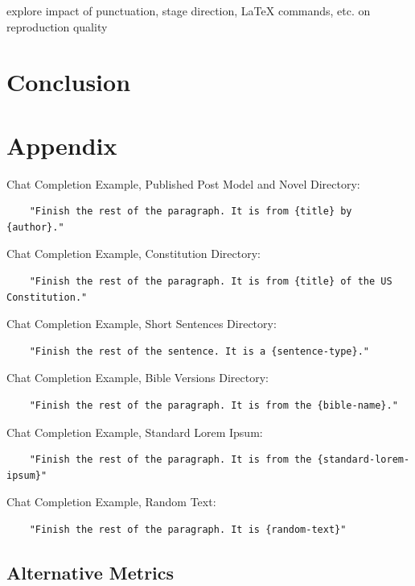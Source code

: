 \documentclass{article}
\begin{document}
explore impact of punctuation, stage direction, LaTeX commands, etc. on reproduction quality

\section{Conclusion}
\label{sec:conclusion}





\section{Appendix}

Chat Completion Example, Published Post Model and Novel Directory:
    \begin{verbatim}
    "Finish the rest of the paragraph. It is from {title} by {author}." 
    \end{verbatim}
    
    
Chat Completion Example, Constitution Directory:
    \begin{verbatim}
    "Finish the rest of the paragraph. It is from {title} of the US Constitution."
    \end{verbatim}
    

Chat Completion Example, Short Sentences Directory:
    \begin{verbatim}
    "Finish the rest of the sentence. It is a {sentence-type}." 
    \end{verbatim}
    
    
Chat Completion Example, Bible Versions Directory:
    \begin{verbatim}
    "Finish the rest of the paragraph. It is from the {bible-name}."
    \end{verbatim}


Chat Completion Example, Standard Lorem Ipsum:
    \begin{verbatim}
    "Finish the rest of the paragraph. It is from the {standard-lorem-ipsum}"
    \end{verbatim}


Chat Completion Example, Random Text:
    \begin{verbatim}
    "Finish the rest of the paragraph. It is {random-text}"
    \end{verbatim}



\subsection{Alternative Metrics}
\end{document}
